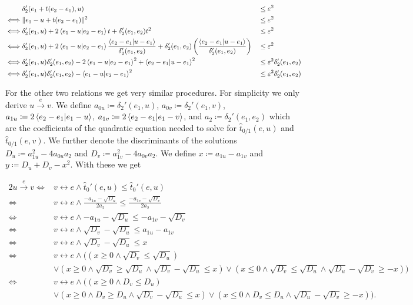 \begin{alignat*}{3}
&\delta_2'(e_1 + t(e_2 - e_1), u) &&\leq \varepsilon^2 \\
  \iff& \|e_1 - u + t(e_2 - e_1)\|^2 &&\leq \varepsilon^2 \\
  \iff& \delta_2'(e_1, u) + 2\braket{e_1 - u | e_2 - e_1}t + \delta_2'(e_1, e_2)t^2 &&\leq \varepsilon^2 \\
  \iff& \delta_2'(e_1, u) + 2\braket{e_1 - u | e_2 - e_1}\frac{\braket{e_2 - e_1 | u - e_1}}{\delta_2'(e_1, e_2)} + \delta_2'(e_1, e_2)\left(\frac{\braket{e_2 - e_1 | u - e_1}}{\delta_2'(e_1, e_2)}\right) &&\leq \varepsilon^2 \\
  \iff& \delta_2'(e_1, u)\delta_2'(e_1, e_2) - 2\braket{e_1 - u | e_2 - e_1}^2 + \braket{e_2 - e_1 | u - e_1}^2 &&\leq \varepsilon^2 \delta_2'(e_1, e_2)\\
  \iff& \delta_2'(e_1, u)\delta_2'(e_1, e_2) - \braket{e_1 - u | e_2 - e_1}^2 &&\leq \varepsilon^2 \delta_2'(e_1, e_2)
\end{alignat*}

For the other two relations we get very similar procedures. For simplicity we only derive \(u \overset e\rightarrow v\). We define \(a_{0u} \coloneq \delta_2'(e_1, u)\), \(a_{0v} \coloneq \delta_2'(e_1, v)\), \(a_{1u} \coloneq 2\braket{e_2 - e_1 | e_1 - u}\), \(a_{1v} \coloneq 2\braket{e_2 - e_1 | e_1 - v}\), and \(a_{2} \coloneq \delta_2'(e_1, e_2)\) which are the coefficients of the quadratic equation needed to solve for \(\hat t_{0/1}(e, u)\) and \(\hat t_{0/1}(e, v)\). We further denote the discriminants of the solutions \(D_u \coloneq a_{1u}^2 - 4a_{0u}a_2\) and \(D_v \coloneq a_{1v}^2 - 4a_{0v}a_2\). We define \(x  \coloneq a_{1u} - a_{1v}\) and \(y \coloneq D_u + D_v - x^2\). With these we get 

\begin{alignat*}{2}
  u \overset e\rightarrow v \iff& v \leftrightarrow e \land \hat t_0'(e, u) \leq \hat t_0'(e, u) \\
  \iff& v \leftrightarrow e \land \frac{-a_{1u} - \sqrt{D_u}}{2a_2} \leq \frac{-a_{1v} - \sqrt{D_v}}{2a_2} \\
  \iff& v \leftrightarrow e \land -a_{1u} - \sqrt{D_u} \leq -a_{1v} - \sqrt{D_v} \\
  \iff& v \leftrightarrow e \land \sqrt{D_v} - \sqrt{D_u} \leq a_{1u} - a_{1v}  \\
  \iff& v \leftrightarrow e \land \sqrt{D_v} - \sqrt{D_u} \leq x  \\
  \iff& v \leftrightarrow e \land ((x \geq 0 \land \sqrt{D_v} \leq \sqrt{D_u})\\ & \lor (x \geq 0 \land \sqrt{D_v} \geq \sqrt{D_u} \land \sqrt{D_v} - \sqrt{D_u} \leq x )\lor(x \leq 0 \land \sqrt{D_v} \leq \sqrt{D_u} \land \sqrt{D_u} - \sqrt{D_v} \geq -x ) )  \\
  \iff& v \leftrightarrow e \land ((x \geq 0 \land D_v \leq D_u)\\ & \lor (x \geq 0 \land D_v \geq D_u \land \sqrt{D_v} - \sqrt{D_u} \leq x )\lor(x \leq 0 \land D_v \leq D_u \land \sqrt{D_u} - \sqrt{D_v} \geq -x ) ).
\end{alignat*}

